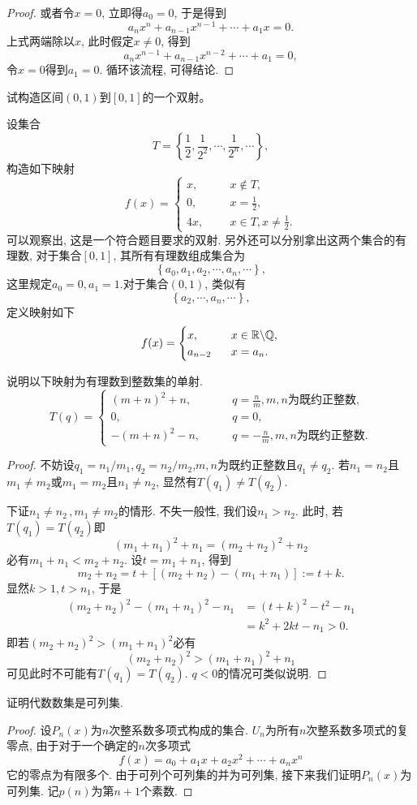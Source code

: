 \begin{quiza}
\begin{proof}
        或者令\(x=0\), 立即得\(a_0=0\), 于是得到\[a_nx^n+a_{n-1}x^{n-1}+\cdots+a_1x=0.\]上式两端除以\(x\), 此时假定\(x\ne 0\), 得到\[a_nx^{n-1}+a_{n-1}x^{n-2}+\cdots+a_1=0,\]令\(x=0\)得到\(a_1=0\). 循环该流程, 可得结论.
\end{proof}
\woe 试构造区间\(\left(0,1\right)\)到\(\left[0,1\right]\)的一个双射。
\begin{solution}
设集合
    \[T=\left\lbrace\frac{1}{2},\frac{1}{2^2},\cdots,\frac{1}{2^n},\cdots\right\rbrace,\]构造如下映射\[f(x)=\begin{cases}
        x,\qquad &x\notin T,\\
        0, &x=\frac{1}{2},\\
        4x,& x\in T,x\ne \frac{1}{2}.
    \end{cases}\]
    可以观察出, 这是一个符合题目要求的双射. 另外还可以分别拿出这两个集合的有理数, 对于集合\([0,1]\), 其所有有理数组成集合为\[\left\lbrace a_0,a_1,a_2,\cdots,a_n,\cdots \right\rbrace,\] 这里规定\(a_0=0,a_1=1.\)对于集合\((0,1)\), 类似有\[\left\lbrace a_2,\cdots,a_n,\cdots \right\rbrace,\] 定义映射如下\[f(x)=\begin{cases}
        x,\qquad &x\in \mathbb{R}\backslash\mathbb{Q},\\
        a_{n-2}&x=a_n.
    \end{cases}\hfill\qedhere\]
\end{solution}
\woe 说明以下映射为有理数到整数集的单射.\[T(q)=\begin{cases}
        (m+n)^2+n,\qquad & q=\frac{n}{m},m,n \text{为既约正整数},\\
        0,&q=0,\\
        -(m+n)^2-n,\qquad & q=-\frac{n}{m},m,n \text{为既约正整数}.
    \end{cases}\]
\begin{proof}
不妨设\(q_1=n_1/m_1,q_2=n_2/m_2\),\(m,n\)为既约正整数且\(q_1\ne q_2.\) 若\(n_1=n_2\)且\(m_1\ne m_2\)或\(m_1=m_2\)且\(n_1\ne n_2\), 显然有\(T(q_1)\ne T(q_2)\). 

下证\(n_1\ne n_2\,,m_1\ne m_2\)的情形. 不失一般性, 我们设\(n_1>n_2\). 此时, 若\(T(q_1)=T(q_2)\)即\[(m_1+n_1)^2+n_1=(m_2+n_2)^2+n_2\]必有\(m_1+n_1<m_2+n_2\). 设\(t=m_1+n_1\), 得到\[m_2+n_2=t+[(m_2+n_2)-(m_1+n_1)]:=t+k.\]
显然\(k>1,t>n_1\), 于是\[\begin{split}
    (m_2+n_2)^2-(m_1+n_1)^2-n_1&=(t+k)^2-t^2-n_1\\
    &=k^2+2kt-n_1>0.
\end{split}\]
即若\((m_2+n_2)^2>(m_1+n_1)^2\)必有\[(m_2+n_2)^2>(m_1+n_1)^2+n_1\]可见此时不可能有\(T(q_1)=T(q_2)\). \(q<0\)的情况可类似说明.
\end{proof}
\woe 证明代数数集是可列集.
\begin{proof}
设\(P_n(x)\)为\(n\)次整系数多项式构成的集合. \(U_n\)为所有\(n\)次整系数多项式的复零点, 由于对于一个确定的\(n\)次多项式\[f(x)=a_0+a_1x+a_2x^2+\cdots+a_nx^n\]它的零点为有限多个. 由于可列个可列集的并为可列集, 接下来我们证明\(P_n(x)\)为可列集. 记\(p(n)\)为第\(n+1\)个素数.


\end{proof}
\end{quiza}
